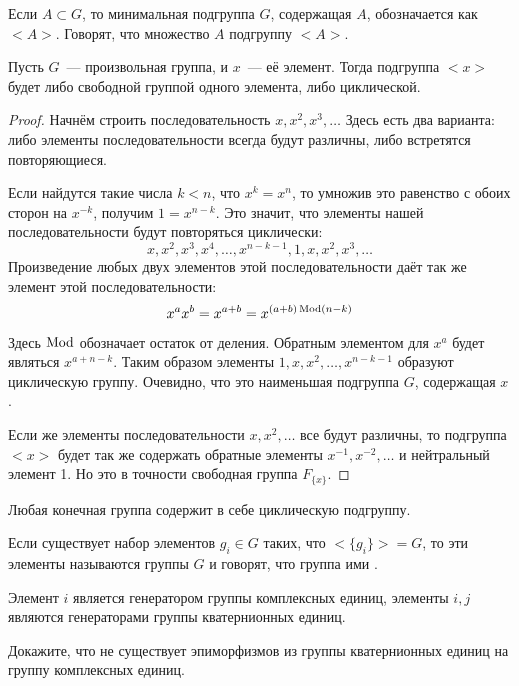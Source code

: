 Если $A\subset G$, то минимальная подгруппа $G$, содержащая $A$, обозначается как $<A>$. Говорят, что множество $A$  подгруппу $<A>$.

\begin{thm}
	Пусть $G$~— произвольная группа, и $x$~— её элемент. Тогда подгруппа $<x>$ будет либо свободной группой одного элемента, либо циклической.
\end{thm}
\begin{proof}
	Начнём строить последовательность $x, x^2, x^3, \ldots$ Здесь есть два варианта: либо элементы последовательности всегда будут различны, либо встретятся повторяющиеся.
	
	Если найдутся такие числа $k<n$, что $x^k = x^n$, то умножив это равенство с обоих сторон на $x^{-k}$, получим $1 = x^{n-k}$. Это значит, что элементы нашей последовательности будут повторяться циклически:
	\[
	x, x^2, x^3, x^4, \ldots, x^{n-k-1}, 1, x, x^2, x^3, \ldots
	\]
	Произведение любых двух элементов этой последовательности даёт так же элемент этой последовательности:
	\[
	x^a x^b = x^{a + b} = x^{(a+b)\operatorname{Mod} (n-k)}
	\]
	Здесь $\operatorname{Mod}$ обозначает остаток от деления. Обратным элементом для $x^a$ будет являться $x^{a+n-k}$. Таким образом элементы $1, x, x^2, \ldots, x^{n-k-1}$ образуют циклическую группу. Очевидно, что это наименьшая подгруппа $G$, содержащая $x$.
	
	Если же элементы последовательности $x, x^2, \ldots$ все будут различны, то подгруппа $<x>$ будет так же содержать обратные элементы $x^{-1}, x^{-2}, \ldots$ и нейтральный элемент 1. Но это в точности свободная группа $F_{\{x\}}$.
\end{proof}

\begin{corollary}
	Любая конечная группа содержит в себе циклическую подгруппу.
\end{corollary}

\begin{definition}
	Если существует набор элементов $g_i \in G$ таких, что $<\{g_i\}> = G$, то эти элементы называются  группы $G$ и говорят, что группа ими .
\end{definition}

\begin{example}
	Элемент $i$ является генератором группы комплексных единиц, элементы $i, j$ являются генераторами группы кватернионных единиц.
\end{example}

\begin{exercise}
	Докажите, что не существует эпиморфизмов из группы кватернионных единиц на группу комплексных единиц.
\end{exercise}

